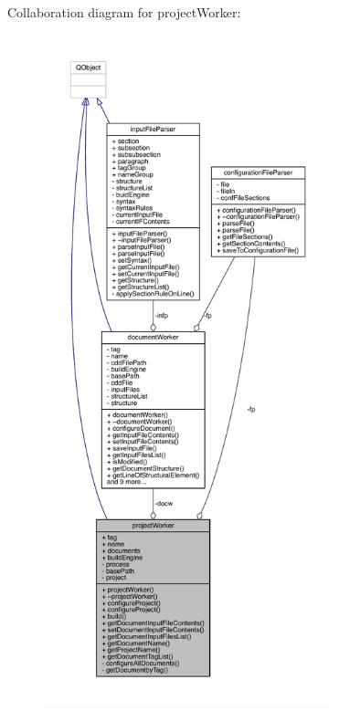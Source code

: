 Collaboration diagram for project\+Worker\+:\nopagebreak
\begin{figure}[H]
\begin{center}
\leavevmode
\includegraphics[height=550pt]{classproject_worker__coll__graph}
\end{center}
\end{figure}
